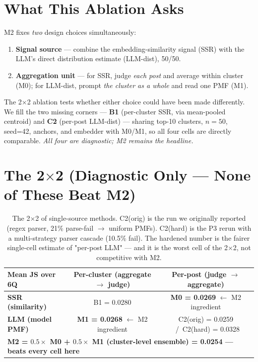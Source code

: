 \documentclass[10pt,a4paper]{article}
\newcommand{\good}[1]{\textcolor{green!50!black}{\textbf{#1}}}
\newcommand{\bad}[1]{\textcolor{red!60!black}{#1}}
\begin{document}
\section{What This Ablation Asks}

M2 fixes \emph{two} design choices simultaneously:

\begin{enumerate}[leftmargin=*,itemsep=0pt]
    \item \textbf{Signal source} — combine the embedding-similarity signal (SSR) with the LLM's direct distribution estimate (LLM-dist), 50/50.
    \item \textbf{Aggregation unit} — for SSR, judge \emph{each post} and average within cluster (M0); for LLM-dist, prompt \emph{the cluster as a whole} and read one PMF (M1).
\end{enumerate}

The 2$\times$2 ablation tests whether either choice could have been made differently. We fill the two missing corners — \textbf{B1} (per-cluster SSR, via mean-pooled centroid) and \textbf{C2} (per-post LLM-dist) — sharing top-10 clusters, $n=50$, seed=42, anchors, and embedder with M0/M1, so all four cells are directly comparable. \emph{All four are diagnostic; M2 remains the headline.}

\section{The 2$\times$2 (Diagnostic Only — None of These Beat M2)}

\begin{table}[H]
\centering
\small
\begin{tabular}{l c c}
\toprule
\textbf{Mean JS over 6Q} & \textbf{Per-cluster} (aggregate $\to$ judge) & \textbf{Per-post} (judge $\to$ aggregate) \\
\midrule
\textbf{SSR (similarity)} & B1 = 0.0280 & \good{M0 = 0.0269} $\leftarrow$ M2 ingredient \\
\textbf{LLM (model PMF)}  & \good{M1 = 0.0268} $\leftarrow$ M2 ingredient & C2(orig) = 0.0259 \  /\  \bad{C2(hard) = 0.0328} \\
\midrule
\multicolumn{3}{l}{\cellcolor{m2row}\textbf{M2 = $0.5 \times $ M0 + $0.5 \times $ M1 (cluster-level ensemble) = 0.0254 — beats every cell here}} \\
\bottomrule
\end{tabular}
\caption{The 2$\times$2 of single-source methods. C2(orig) is the run we originally reported (regex parser, 21\% parse-fail $\to$ uniform PMFs). C2(hard) is the P3 rerun with a multi-strategy parser cascade (10.5\% fail). The hardened number is the fairer single-cell estimate of "per-post LLM" — and it is the worst cell of the 2$\times$2, not competitive with M2.}
\end{table}
\end{document}
